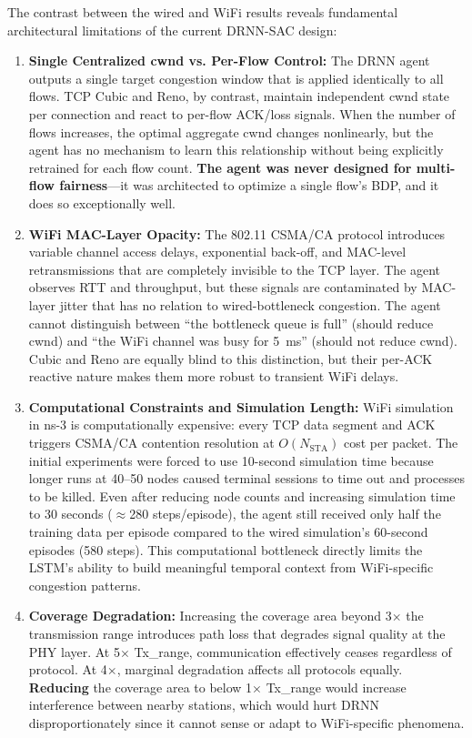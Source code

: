 \documentclass[12pt, a4paper]{article}
\begin{document}
The contrast between the wired and WiFi results reveals fundamental architectural limitations of the current DRNN-SAC design:

\begin{enumerate}
    \item \textbf{Single Centralized cwnd vs. Per-Flow Control:} The DRNN agent outputs a single target congestion window that is applied identically to all flows. TCP Cubic and Reno, by contrast, maintain independent cwnd state per connection and react to per-flow ACK/loss signals. When the number of flows increases, the optimal aggregate cwnd changes nonlinearly, but the agent has no mechanism to learn this relationship without being explicitly retrained for each flow count. \textbf{The agent was never designed for multi-flow fairness}---it was architected to optimize a single flow's BDP, and it does so exceptionally well.

    \item \textbf{WiFi MAC-Layer Opacity:} The 802.11 CSMA/CA protocol introduces variable channel access delays, exponential back-off, and MAC-level retransmissions that are completely invisible to the TCP layer. The agent observes RTT and throughput, but these signals are contaminated by MAC-layer jitter that has no relation to wired-bottleneck congestion. The agent cannot distinguish between ``the bottleneck queue is full'' (should reduce cwnd) and ``the WiFi channel was busy for 5~ms'' (should not reduce cwnd). Cubic and Reno are equally blind to this distinction, but their per-ACK reactive nature makes them more robust to transient WiFi delays.

    \item \textbf{Computational Constraints and Simulation Length:} WiFi simulation in ns-3 is computationally expensive: every TCP data segment and ACK triggers CSMA/CA contention resolution at $O(N_\text{STA})$ cost per packet. The initial experiments were forced to use 10-second simulation time because longer runs at 40--50 nodes caused terminal sessions to time out and processes to be killed. Even after reducing node counts and increasing simulation time to 30 seconds ($\approx$280 steps/episode), the agent still received only half the training data per episode compared to the wired simulation's 60-second episodes (580 steps). This computational bottleneck directly limits the LSTM's ability to build meaningful temporal context from WiFi-specific congestion patterns.

    \item \textbf{Coverage Degradation:} Increasing the coverage area beyond 3$\times$ the transmission range introduces path loss that degrades signal quality at the PHY layer. At 5$\times$ Tx\_range, communication effectively ceases regardless of protocol. At 4$\times$, marginal degradation affects all protocols equally. \textbf{Reducing} the coverage area to below 1$\times$ Tx\_range would increase interference between nearby stations, which would hurt DRNN disproportionately since it cannot sense or adapt to WiFi-specific phenomena.
\end{enumerate}
\end{document}
